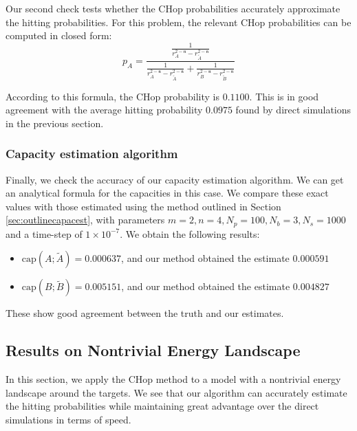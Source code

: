 \documentclass[english, aip, jcp, priprint, graphicx,floatfix]{revtex4-1}
\theoremstyle{plain}
\theoremstyle{definition}
\theoremstyle{plain}
\newcommand{\dimension}{{\mathfrak{n}}}
\newcommand{\capac}[2]{\mathrm{cap}\left(#1;#2\right)}
\begin{document}
Our second check tests whether the CHop probabilities accurately approximate the hitting probabilities.  For this problem, the relevant CHop probabilities can be computed in closed form:
\begin{equation}
p_A = \frac{\frac{1}{r_A^{2 - \dimension} - r_{\tilde{A}}^{2 - \dimension}}}{\frac{1}{r_A^{2 - \dimension} - r_{\tilde{A}}^{2 - \dimension}} + \frac{1}{r_B^{2 - \dimension} - r_{\tilde{B}}^{2 - \dimension}}}
\end{equation}

According to this formula, the CHop probability is $0.1100$.  This is in good agreement with the average hitting probability $0.0975$ found by direct simulations in the previous section.


\subsubsection{Capacity estimation algorithm}



Finally, we check the accuracy of our capacity estimation algorithm.  We can get an analytical formula for the capacities in this case.  We compare these exact values with those estimated using the method outlined in Section \ref{sec:outlinecapacest}, with parameters $m = 2, n = 4, N_p = 100, N_b = 3, N_s = 1000$ and a time-step of $1 \times 10^{-7}$.  We obtain the following results:

\begin{itemize}
\item $\capac{A}{\tilde{A}}= 0.000637 $, and our method obtained the estimate $0.000591$ 
\item $\capac{B}{\tilde{B}}= 0.005151 $, and our method obtained the estimate $0.004827$ 
\end{itemize}

These show good agreement between the truth and our estimates.

\subsection{Results on Nontrivial Energy Landscape}




In this section, we apply the CHop method to a model with a nontrivial energy landscape around the targets. We see that our algorithm can accurately estimate the hitting probabilities while maintaining great advantage over the direct simulations in terms of speed.
\end{document}
